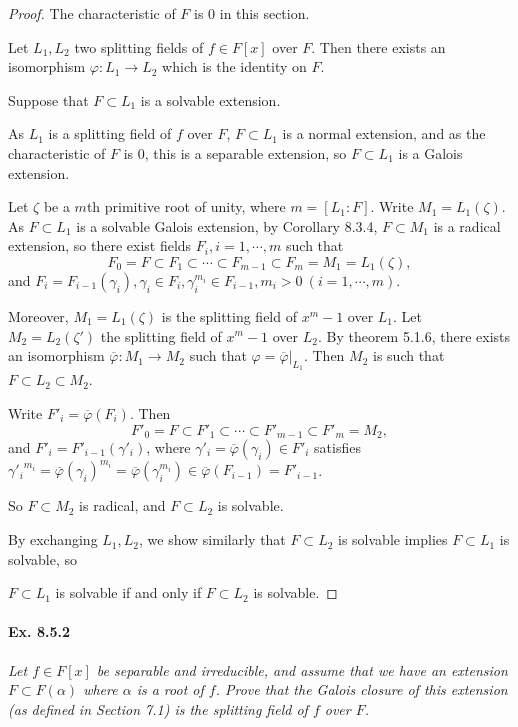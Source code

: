 \documentclass[11pt,a4paper]{article}
\begin{document}
\begin{proof}
The characteristic of $F$ is 0 in this section. 

Let $L_1,L_2$ two splitting fields of $f \in F[x]$ over $F$. Then there exists an isomorphism $\varphi : L_1\to L_2$ which is the identity on $F$.

Suppose that $F \subset L_1$ is a solvable extension.

 As $L_1$ is a splitting field of $f$ over $F$, $F\subset L_1$ is a normal extension, and as the characteristic of $F$ is 0, this is a separable extension, so $F\subset L_1$ is a Galois extension.

Let $\zeta$ be a $m$th primitive root of unity, where $m =[L_1:F]$. Write $M_1 = L_1(\zeta)$.  As $F \subset L_1$ is a solvable Galois extension, by Corollary 8.3.4,  $F \subset M_1$ is a radical extension, so there exist fields $F_i, i=1,\cdots,m$ such that 
$$F_0 = F \subset F_1\subset \cdots \subset F_{m-1} \subset F_m =M_1=L_1(\zeta), $$
and $F_i = F_{i-1}(\gamma_i), \gamma_i \in F_i, \gamma_i^{m_i} \in F_{i-1},m_i>0\  (i=1,\cdots,m)$.

Moreover, $M_1 = L_1(\zeta)$ is the splitting field of $x^m-1$ over $L_1$. Let $M_2 = L_2(\zeta')$ the splitting field of $x^m-1$ over $L_2$. By theorem 5.1.6, there exists an isomorphism $\overline{\varphi} : M_1\to M_2$ such that $\varphi = \overline{\varphi}\vert_{L_1}$. Then $M_2$  is such that $F \subset L_2 \subset M_2$. 

Write $F'_i = \overline{\varphi}(F_i)$. Then
$$F'_0 = F \subset F'_1\subset \cdots \subset F'_{m-1} \subset F'_m =M_2,$$
and $F'_i = F'_{i-1}(\gamma'_i)$, where $\gamma'_i = \overline{\varphi}(\gamma_i) \in F'_{i}$ satisfies ${\gamma'_i}^{m_i} = \overline{\varphi}(\gamma_i)^{m_i} = \overline{\varphi}(\gamma_i^{m_i}) \in \overline{\varphi}(F_{i-1}) = F'_{i-1}$.

So $F \subset M_2$ is radical, and $ F \subset L_2$ is solvable.

By exchanging  $L_1,L_2$, we show similarly that $F \subset L_2$ is solvable implies $F\subset L_1$ is solvable, so

$F \subset L_1$ is solvable if and only if $F \subset L_2$ is solvable.
\end{proof}

\paragraph{Ex. 8.5.2}

{\it Let $f\in F[x]$ be separable and irreducible, and assume that we have an extension $F \subset F(\alpha)$ where $\alpha$ is a root of $f$. Prove that the Galois closure of this extension (as defined in Section 7.1) is the splitting field of $f$ over $F$.
}
\end{document}
